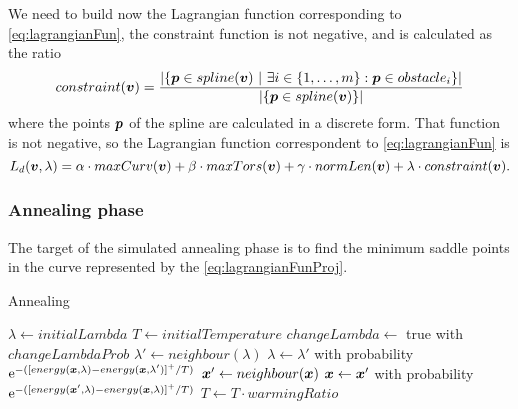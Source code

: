\documentclass[dissertation.tex]{subfiles}
\begin{document}
We need to build now the Lagrangian function corresponding to
\cref{eq:lagrangianFun}, the constraint function is not negative, and is calculated as the
ratio
\begin{equation*}
constraint(\boldsymbol{v}) = \frac{|\{\boldsymbol{p} \in spline(\boldsymbol{v})\ |\ \exists i\in\{1,\dots,m\}
  : \boldsymbol{p}\in obstacle_i \}|}{|\{\boldsymbol{p} \in spline(\boldsymbol{v})\}|}
\end{equation*}
where the points $\boldsymbol{p}$ of the spline are calculated in a discrete form. That
function is not negative, so the Lagrangian function correspondent to
\cref{eq:lagrangianFun} is
\begin{equation}\label{eq:lagrangianFunProj}
    L_d(\boldsymbol{v},\lambda)=\alpha\cdot maxCurv(\boldsymbol{v})+\beta\cdot
    maxTors(\boldsymbol{v})+\gamma\cdot normLen(\boldsymbol{v})+\lambda\cdot constraint(\boldsymbol{v}).
\end{equation}

\subsubsection{Annealing phase}
The target of the simulated annealing phase is to find the minimum
saddle points in
the curve represented by the
\cref{eq:lagrangianFunProj}.
\begin{algorithm}
 \caption{Annealing}\label{alg:annealing}
 \begin{algorithmic}[1]
   \State $\lambda\gets initialLambda$\label{alg:annealing:initialize}
   \State $T\gets initialTemperature$
   \label{alg:annealing:while}
   \label{alg:annealing:for}
   \State $changeLambda\gets$ true with $changeLambdaProb$\label{alg:annealing:lambdaProb}
   \State $\lambda'\gets neighbour(\lambda)$\label{alg:annealing:changeLambda}
   \State $\lambda\gets \lambda'$ with probability $\mathrm{e}^{-([energy(\boldsymbol{x},\lambda)-energy(\boldsymbol{x},\lambda')]^+/T)}$
   \Else
   \State $\boldsymbol{x}'\gets neighbour(\boldsymbol{x})$\label{alg:annealing:changeX}
   \State $\boldsymbol{x}\gets \boldsymbol{x}'$ with probability $\mathrm{e}^{-([energy(\boldsymbol{x}',\lambda)-energy(\boldsymbol{x},\lambda)]^+/T)}$
   \EndIf
   \EndFor
   \State $T\gets T\cdot warmingRatio$\label{alg:annealing:cooling}
   \EndWhile
   \EndProcedure
 \end{algorithmic}
\end{algorithm}
\end{document}

